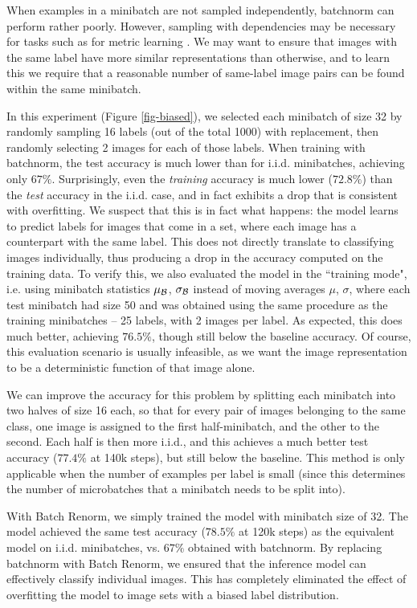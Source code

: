 When examples in a minibatch are not sampled independently, batchnorm can 
perform rather poorly. However, sampling with dependencies  may be necessary for tasks such as for metric learning \cite{nca,facenet}. We may want to ensure that images with the same label have more similar representations than otherwise, and to learn this we require that a reasonable number of same-label image pairs can be found within the same minibatch.

In this experiment (Figure \ref{fig-biased}), we selected each minibatch of size 32 by randomly sampling 16 labels (out of the total 1000) with replacement, then randomly selecting 2 images for each of those labels.
When training with batchnorm, the test accuracy is much lower than for i.i.d. minibatches, achieving only $67\%$. Surprisingly, even the {\em training} accuracy is much lower ($72.8\%$) than the {\em test} accuracy in the i.i.d. case, and in fact exhibits a drop that is consistent with overfitting. We suspect that this is in fact what happens: the model learns to predict labels for images that come in a set, where each image has a counterpart with the same label. This does not directly translate to classifying images individually, thus producing a drop in the accuracy computed on the training data. To verify this, we also evaluated the model in the ``training mode", i.e. using minibatch statistics $\mu_{\mathcal{B}}$, $\sigma_{\mathcal{B}}$ instead of moving averages $\mu$, $\sigma$, where each test minibatch had size 50 and was obtained using the same procedure as the training minibatches -- 25 labels, with 2 images per label. As expected, this does much better, achieving $76.5\%$, though still below the baseline accuracy. Of course, this evaluation scenario is usually infeasible, as we want the image representation to be a deterministic function of that image alone.

We can improve the accuracy for this problem by splitting each minibatch into two halves of size 16 each, so that for every pair of images belonging to the same class, one image is assigned to the first half-minibatch, and the other to the second. Each half is then more i.i.d., and this achieves a much better test accuracy ($77.4\%$ at 140k steps), but still below the baseline. This method is only applicable when the number of examples per label is small (since this determines the number of microbatches that a minibatch needs to be split into).

With Batch Renorm, we simply trained the model with minibatch size of 32. The model achieved the same test accuracy ($78.5\%$ at 120k steps) as the equivalent model on i.i.d. minibatches, vs. $67\%$ obtained with batchnorm. By replacing batchnorm with Batch Renorm, we ensured that the inference model can effectively classify individual images. This has completely eliminated the effect of overfitting the model to image sets with a biased label distribution.


